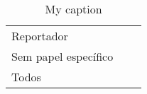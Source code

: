 \begin{table}[]
{\begin{tabular}{@{}lll@{}}
Reportador                             & \cite{Bettenburg2008a, Tu:2014:MQI:2677832.2677844, Vijayakumar2014, Moran:2015:EAA:2786805.2807557, Thung2014, moran2015auto}                                                                                                                                                                                                                                                                                                                                                                                                                                                                                                 &                                    \\
Sem papel específico                   & \cite{dal2013closer}                                                                                                                                                                                                                                                                                                                                                                                                                                                                                                                                                                                                           &                                    \\
Todos                                  & \cite{hora2012bug, takama2013application, dal2014bug}                                                                                                                                                                                                                                                                                                                                                                                                                                                                                                                                                                          &                                   
\end{tabular}%
}
\caption{My caption}
\label{my-label}
\end{table}
